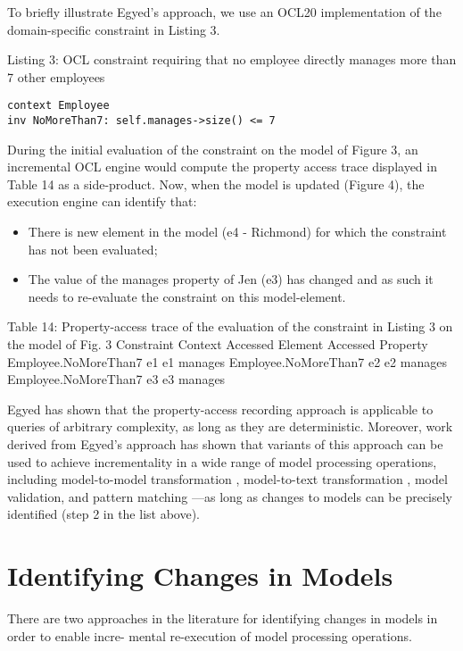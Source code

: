 \documentclass{llncs}
\begin{document}
To brieﬂy illustrate Egyed’s approach, we use an OCL20 implementation of the domain-specific
constraint in Listing 3.

Listing 3: OCL constraint requiring that no employee directly manages more than 7 other employees

\begin{lstlisting}[style=ocl,caption={OCL constraint requiring that no employee directly manages more than 7 other employees.},label=constraint]
context Employee
inv NoMoreThan7: self.manages->size() <= 7
\end{lstlisting}

During the initial evaluation of the constraint on the model of Figure 3, an incremental OCL engine would compute the property access trace displayed in Table 14 as a side-product. Now, when the model is updated (Figure 4), the execution engine can identify that:

\begin{itemize}
\item There is new element in the model (e4 - Richmond) for which the constraint has not been evaluated;
\item The value of the manages property of Jen (e3) has changed and as such it needs to re-evaluate
the constraint on this model-element.
\end{itemize}

Table 14: Property-access trace of the evaluation of the constraint in Listing 3 on the model of Fig. 3
Constraint Context Accessed Element Accessed Property
Employee.NoMoreThan7 e1 e1 manages
Employee.NoMoreThan7 e2 e2 manages
Employee.NoMoreThan7 e3 e3 manages

Egyed has shown that the property-access recording approach is applicable to queries of arbitrary complexity, as long as they are deterministic. Moreover, work derived from Egyed’s approach has shown that variants of this approach can be used to achieve incrementality in a wide range of model
processing operations, including model-to-model transformation \cite{jouault2010towards}, model-to-text transformation \cite{ogunyomi2015property}, model validation, and pattern matching \cite{rath2012derived}---as long as changes to models can be precisely identified (step 2 in the list above).

\section{Identifying Changes in Models}
There are two approaches in the literature for identifying changes in models in order to enable incre-
mental re-execution of model processing operations.
\end{document}
